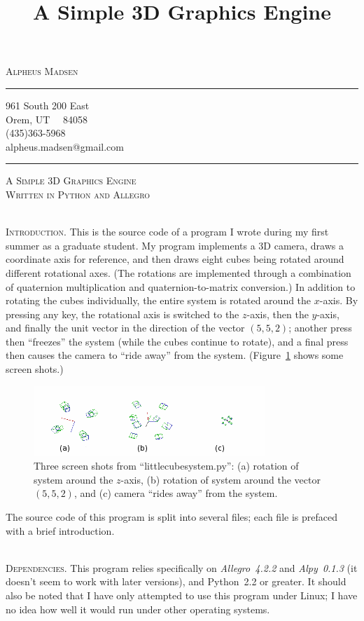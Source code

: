 \documentclass[12pt]{article}
\title{A Simple 3D Graphics Engine}
\author{\headerstuff}
\date{}
\makeatletter
\newcommand{\titleize}[1]{
   \begin{center}
       \Large \textsc{#1} \normalsize \\
   \end{center}
}
\newcommand{\normaltitleize}[1]{\mbox{}\\ \textsc{#1} \normalsize}
\newcommand{\headerstuff}{
   \begin{center}
   \textsc{\Large{Alpheus Madsen}}

   \rule{1in}{.01in}

   961 South 200 East \\

   Orem, UT \ \ 84058  \\

   (435)363-5968 \\

   alpheus.madsen@gmail.com

   \rule{2in}{.01in}
   \end{center}
}
\makeatother
\begin{document}

\headerstuff

\titleize{A Simple 3D Graphics Engine\\Written in Python and Allegro}

\normaltitleize{Introduction.}  This is the source code of a program I wrote during my first summer as a graduate student.  My program implements a 3D camera, draws a coordinate axis for reference, and then draws eight cubes being rotated around different rotational axes.  (The rotations are implemented through a combination of quaternion multiplication and quaternion-to-matrix conversion.)  In addition to rotating the cubes individually, the entire system is rotated around the $x$-axis.  By pressing any key, the rotational axis is switched to the $z$-axis, then the $y$-axis, and finally the unit vector in the direction of the vector $(5, 5, 2)$; another press then ``freezes'' the system (while the cubes continue to rotate), and a final press then causes the camera to ``ride away'' from the system.  (Figure~\ref{screenshots} shows some screen shots.)

\begin{figure}[!hbtp]
   \includegraphics{screenshots4.png}
\caption{Three screen shots from ``littlecubesystem.py'': (a) rotation of system around the $z$-axis, (b) rotation of system around the vector $(5, 5, 2)$, and (c) camera ``rides away'' from the system.}\label{screenshots}
\end{figure}

The source code of this program is split into several files; each file is prefaced with a brief introduction.

\normaltitleize{Dependencies.}  This program relies specifically on \emph{Allegro~4.2.2} and \emph{Alpy~0.1.3} (it doesn't seem to work with later versions), and Python~2.2 or greater.  It should also be noted that I have only attempted to use this program under Linux; I have no idea how well it would run under other operating systems.
\end{document}
